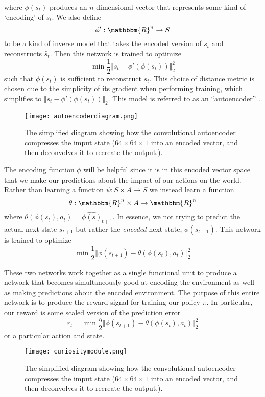 \documentclass[conference, 12pt]{IEEEtran} %
\begin{document}
	where $\phi(s_t)$ produces an $n$-dimensional vector that represents some kind of `encoding' of $s_t$. We also define
	$$
	\phi ' : \mathbbm{R}^n \to S
	$$
	to be a kind of inverse model that takes the encoded version of $s_t$ and reconstructs $\hat{s}_{t}$. 	Then this network is trained to optimize
	$$
	\min \frac{1}{2} \Vert s_t - \phi ' (\phi (s_t)) \Vert ^2 _2
	$$
	such that $\phi(s_t)$ is sufficient to reconstruct $s_t$. This choice of distance metric is chosen due to the simplicity of its gradient when performing training, which simplifies to $ \Vert s_t - \phi ' (\phi (s_t)) \Vert _2 $. This model is referred to as an ``autoencoder'' \cite{autoencoder}.
	\begin{figure*}[ht]
		\centering
		\texttt{[image: autoencoderdiagram.png]}
		\caption{The simplified diagram showing how the convolutional autoencoder compresses the imput state ($64 \times 64 \times 1$ into an encoded vector, and then deconvolves it to recreate the output.).}
		\label{fig:autoencoderdiagram}
	\end{figure*}
	\par The encoding function $\phi$ will be helpful since it is in this encoded vector space that we make our predictions about the impact of our actions on the world. Rather than learning a function $	\psi : S \times A \to S $ we instead learn a function
	$$
	\theta: \mathbbm{R}^n \times A \to \mathbbm{R}^n
	$$
	where $\theta(\phi(s_t), a_t) = \hat{\phi(s)}_{t+1}$. In essence, we not trying to predict the actual next state $s_{t+1}$ but rather the \textit{encoded} next state, $\phi(s_{t+1})$. This network is trained to optimize
	$$
	\min \frac{1}{2} \Vert \phi(s_{t+1}) - \theta(\phi(s_t), a_t)  \Vert ^2 _2
	$$
	\par These two networks work together as a single functional unit to produce a network that becomes simultaneously good at encoding the environment as well as making predictions about the encoded environment. The purpose of this entire network is to produce the reward signal for training our policy $\pi$. In particular, our reward is some scaled version of the prediction error
	$$
	r_{t} = \min \frac{\eta}{2} \Vert \phi(s_{t+1}) - \theta(\phi(s_t), a_t)  \Vert ^2 _2
	$$
	or a particular action and state.
		\begin{figure*}[ht]
		\centering
		\texttt{[image: curiositymodule.png]}
		\caption{The simplified diagram showing how the convolutional autoencoder compresses the imput state ($64 \times 64 \times 1$ into an encoded vector, and then deconvolves it to recreate the output.).}
		\label{fig:curiositymodule}
	\end{figure*}
\end{document}
